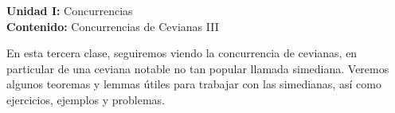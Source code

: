 {\Large
    \textbf{Unidad I:} Concurrencias\vspace{2mm}\\
    \textbf{Contenido:} Concurrencias de Cevianas III
}

En esta tercera clase, seguiremos viendo la concurrencia de cevianas, en particular de una ceviana notable no tan popular llamada simediana.
Veremos algunos teoremas y lemmas útiles para trabajar con las simedianas, así como ejercicios, ejemplos y problemas.